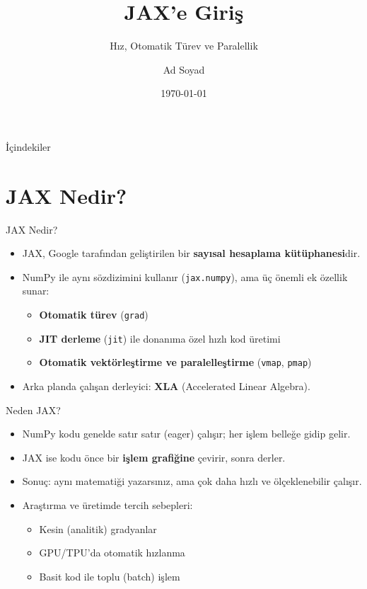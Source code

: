 \documentclass[aspectratio=169]{beamer}
\title{JAX'e Giriş}
\subtitle{Hız, Otomatik Türev ve Paralellik}
\author{Ad Soyad}
\date{\today}
\begin{document}
\begin{frame}
  \titlepage
\end{frame}

\begin{frame}{İçindekiler}
  \tableofcontents
\end{frame}

\section{JAX Nedir?}

\begin{frame}{JAX Nedir?}
  \begin{itemize}
    \item JAX, Google tarafından geliştirilen bir \textbf{sayısal hesaplama kütüphanesi}dir.
    \item NumPy ile aynı sözdizimini kullanır (\texttt{jax.numpy}), ama üç önemli ek özellik sunar:
    \begin{itemize}
      \item \textbf{Otomatik türev} (\texttt{grad})
      \item \textbf{JIT derleme} (\texttt{jit}) ile donanıma özel hızlı kod üretimi
      \item \textbf{Otomatik vektörleştirme ve paralelleştirme} (\texttt{vmap}, \texttt{pmap})
    \end{itemize}
    \item Arka planda çalışan derleyici: \textbf{XLA} (Accelerated Linear Algebra).
  \end{itemize}
\end{frame}

\begin{frame}{Neden JAX?}
  \begin{itemize}
    \item NumPy kodu genelde satır satır (eager) çalışır; her işlem belleğe gidip gelir.
    \item JAX ise kodu önce bir \textbf{işlem grafiğine} çevirir, sonra derler.
    \item Sonuç: aynı matematiği yazarsınız, ama çok daha hızlı ve ölçeklenebilir çalışır.
    \item Araştırma ve üretimde tercih sebepleri:
    \begin{itemize}
      \item Kesin (analitik) gradyanlar
      \item GPU/TPU'da otomatik hızlanma
      \item Basit kod ile toplu (batch) işlem
    \end{itemize}
  \end{itemize}
\end{frame}
\end{document}
